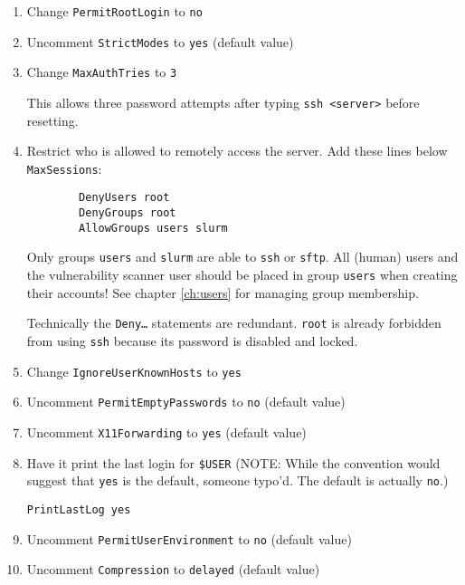 \begin{enumerate}
\begin{enumerate}
      \item Change \texttt{PermitRootLogin} to \texttt{no}

      \item Uncomment \texttt{StrictModes} to \texttt{yes} (default value)

      \item Change \texttt{MaxAuthTries} to \texttt{3}

        This allows three password attempts after typing \texttt{ssh <server>} before resetting.

      \item Restrict who is allowed to remotely access the server. Add these lines below \texttt{MaxSessions}:
		\begin{verbatim}
		DenyUsers root
		DenyGroups root
		AllowGroups users slurm 
		\end{verbatim}

        Only groups \texttt{users} and \texttt{slurm} are able to \texttt{ssh} or \texttt{sftp}. All (human) users and the vulnerability scanner user should be placed in group \texttt{users} when creating their accounts! See chapter \ref{ch:users} for managing group membership.

        Technically the \texttt{Deny\dots} statements are redundant. \texttt{root} is already forbidden from using \texttt{ssh} because its password is disabled and locked.

      \item Change \texttt{IgnoreUserKnownHosts} to \texttt{yes}

      \item Uncomment \texttt{PermitEmptyPasswords} to \texttt{no} (default value)

      \item Uncomment \texttt{X11Forwarding} to \texttt{yes} (default value)

      \item Have it print the last login for \texttt{\$USER} (NOTE: While the convention would suggest that \texttt{yes} is the default, someone typo'd. The default is actually \texttt{no}.)

        \texttt{PrintLastLog yes}

      \item Uncomment \texttt{PermitUserEnvironment} to \texttt{no} (default value)

      \item Uncomment \texttt{Compression} to \texttt{delayed} (default value)


\end{enumerate}
\end{enumerate}
